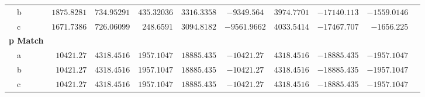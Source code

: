 \documentclass[12pt]{article}
\begin{document}
\begin{landscape}
\begin{table}
\begin{tabular}{lrrrrcrrrr}
~~b&$1875.8281$&$734.95291$&$435.32036$&$3316.3358$&$-9349.564$&$ 3974.7701$&$-17140.113$&$-1559.0146$  \tabularnewline
~~c&$1671.7386$&$726.06099$&$ 248.6591$&$3094.8182$&$-9561.9662$&$ 4033.5414$&$-17467.707$&$ -1656.225$  \tabularnewline
\hline
{\bfseries p Match}&&&&&&&&&\tabularnewline
~~a&$ 10421.27$&$4318.4516$&$1957.1047$&$18885.435$&$-10421.27$&$ 4318.4516$&$-18885.435$&$-1957.1047$  \tabularnewline
~~b&$ 10421.27$&$4318.4516$&$1957.1047$&$18885.435$&$-10421.27$&$ 4318.4516$&$-18885.435$&$-1957.1047$  \tabularnewline
~~c&$ 10421.27$&$4318.4516$&$1957.1047$&$18885.435$&$-10421.27$&$ 4318.4516$&$-18885.435$&$-1957.1047$  \tabularnewline
\hline
\end{tabular}
\end{table}
\end{landscape}
\newpage
\end{document}
